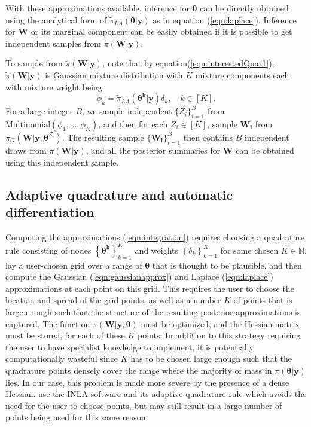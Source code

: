 \documentclass[ba]{imsart}
\begin{document}
With these approximations available, inference for $\boldsymbol{\theta}$ can be directly obtained using the analytical form of $\tilde{\pi}_{LA}(\boldsymbol{\theta}|\boldsymbol{y})$ as in equation (\ref{eqn:laplace}). Inference for $\boldsymbol{W}$ or its marginal component can be easily obtained if it is possible to get independent samples from $\tilde{\pi}(\boldsymbol{W}|\boldsymbol{y})$. 


To sample from $\tilde{\pi}(\boldsymbol{W}|\boldsymbol{y})$, note that by equation(\ref{eqn:interestedQuat1}), $\tilde{\pi}(\boldsymbol{W}|\boldsymbol{y})$ is Gaussian mixture distribution with $K$ mixture components each with mixture weight being $$\phi_k = \tilde{\pi}_{LA}(\boldsymbol{\theta^{k}}|\boldsymbol{y})\delta_{k},\quad k \in [K].$$
For a large integer $B$, we sample independent $\{Z_i\}_{i=1}^{B}$ from $\text{Multinomial}(\phi_1,...,\phi_K)$, and then for each $Z_i \in [K]$, sample $\boldsymbol{W_i}$ from $\tilde{\pi}_{G}(\boldsymbol{W}|\boldsymbol{y},\boldsymbol{\theta}^{Z_i})$. The resulting sample $\{\boldsymbol{W_i}\}_{i=1}^{B}$ then contains $B$ independent draws from $\tilde{\pi}(\boldsymbol{W}|\boldsymbol{y})$, and all the posterior summaries for $\boldsymbol{W}$ can be obtained using this independent sample.




\subsection{Adaptive quadrature and automatic differentiation}


Computing the approximations (\ref{eqn:integration}) requires choosing a quadrature rule consisting of nodes $\left\{\boldsymbol{\theta^{k}}\right\}_{k=1}^{K}$ and weights $\left\{\delta_{k}\right\}_{k=1}^{K}$ for some chosen $K\in\mathbb{N}$. \cite{casecross} lay a user-chosen grid over a range of $\boldsymbol{\theta}$ that is thought to be plausible, and then compute the Gaussian (\ref{eqn:gaussianapprox}) and Laplace (\ref{eqn:laplace}) approximations at each point on this grid. This requires the user to choose the location and spread of the grid points, as well as a number $K$
of points that is large enough such that the structure of the resulting posterior approximations is captured. The function $\pi(\boldsymbol{W}|\boldsymbol{y},\boldsymbol{\theta})$ must be optimized, and the Hessian matrix must be stored, for each of these $K$ points. In addition to this strategy requiring the user to have specialist knowledge to implement, it is potentially computationally wasteful since $K$ has to be chosen large enough such that the quadrature points densely cover the range where the majority of mass in $\pi(\boldsymbol{\theta}|\boldsymbol{y})$ lies. In our case, this problem is made more severe by the presence of a dense Hessian. \cite{inlacoxph} use the INLA software and its adaptive quadrature rule which avoids the need for the user to choose points, but may still result in a large number of points being used for this same reason.
\end{document}
